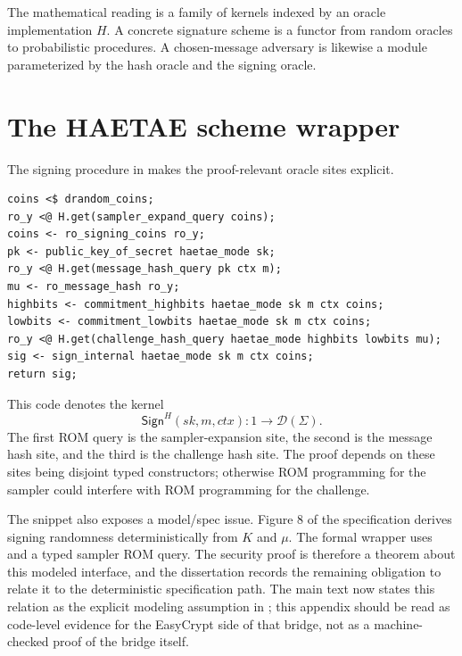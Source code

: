 The mathematical reading is a family of kernels indexed by an oracle
implementation \(H\).  A concrete signature scheme is a functor from random
oracles to probabilistic procedures.  A chosen-message adversary is likewise a
module parameterized by the hash oracle and the signing oracle.

\section{The HAETAE scheme wrapper}
\label{app:case-haetae-scheme-wrapper}

The signing procedure in  makes the proof-relevant oracle
sites explicit.

\begin{lstlisting}[language=EasyCrypt,caption={Signing wrapper in \ec{HAETAE\_Scheme.ec}.},label={lst:haetae-scheme-sign-wrapper}]
coins <$ drandom_coins;
ro_y <@ H.get(sampler_expand_query coins);
coins <- ro_signing_coins ro_y;
pk <- public_key_of_secret haetae_mode sk;
ro_y <@ H.get(message_hash_query pk ctx m);
mu <- ro_message_hash ro_y;
highbits <- commitment_highbits haetae_mode sk m ctx coins;
lowbits <- commitment_lowbits haetae_mode sk m ctx coins;
ro_y <@ H.get(challenge_hash_query haetae_mode highbits lowbits mu);
sig <- sign_internal haetae_mode sk m ctx coins;
return sig;
\end{lstlisting}

This code denotes the kernel
\[
  \mathsf{Sign}^{H}(sk,m,ctx):1\to\mathcal{D}(\Sigma).
\]
The first ROM query is the sampler-expansion site, the second is the message
hash site, and the third is the challenge hash site.  The proof depends on these
sites being disjoint typed constructors; otherwise ROM programming for the
sampler could interfere with ROM programming for the challenge.

The snippet also exposes a model/spec issue.  Figure 8 of the specification
derives signing randomness deterministically from \(K\) and \(\mu\).  The formal
wrapper uses  and a typed sampler ROM query.  The security
proof is therefore a theorem about this modeled interface, and the dissertation
records the remaining obligation to relate it to the deterministic specification
path.  The main text now states this relation as the explicit modeling
assumption in ; this appendix
should be read as code-level evidence for the EasyCrypt side of that bridge, not
as a machine-checked proof of the bridge itself.

